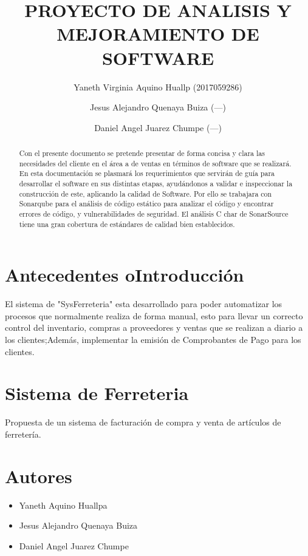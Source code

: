 \documentclass[preprint,12pt]{elsarticle}
\begin{document}
	
	\begin{frontmatter}

		\title{\huge  PROYECTO DE  ANALISIS Y  MEJORAMIENTO DE  SOFTWARE }
		\author{Yaneth Virginia Aquino Huallp                (2017059286)}
		\author{Jesus Alejandro Quenaya Buiza              (---)}
		\author{Daniel Angel Juarez Chumpe              (---)}
		\address{Tacna, Perú}
		


\begin{abstract}
Con el presente documento se pretende presentar de forma concisa y clara las necesidades del cliente en el área a de ventas en términos de software que se realizará. 
En esta documentación se plasmará los requerimientos que servirán de guía para desarrollar el software en sus distintas etapas, ayudándonos a validar e inspeccionar la construcción de este, aplicando la calidad de Software.
Por ello se trabajara con  Sonarqube para el análisis de código estático
para analizar el código y encontrar errores de código, y vulnerabilidades de seguridad. 
El análisis C char de SonarSource tiene una gran cobertura de estándares de calidad bien establecidos.  
\end{abstract}


\end{frontmatter}
\section{Antecedentes oIntroducción}

El sistema de "SysFerreteria" esta desarrollado para poder automatizar los procesos que
normalmente realiza de forma manual, esto para llevar un correcto control del
inventario, compras a proveedores y ventas que se realizan a diario a los clientes;Además, implementar la emisión de Comprobantes de Pago para  los clientes.

\section{Sistema de Ferreteria}
Propuesta de un sistema de facturación de  compra y venta
de artículos de ferretería.
\section{Autores}
\begin{itemize}
    \item Yaneth Aquino Huallpa
    \item Jesus Alejandro Quenaya Buiza  
    \item Daniel Angel Juarez Chumpe
\end{itemize}
\end{document}
